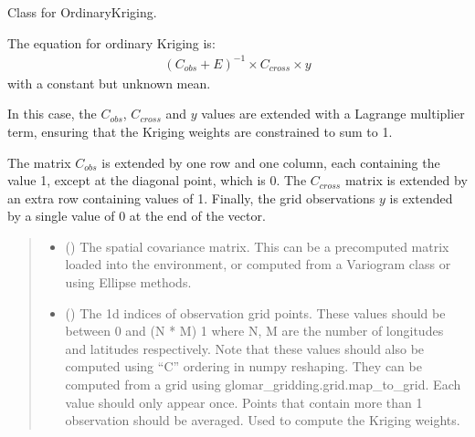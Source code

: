 \documentclass[letterpaper,10pt,english]{sphinxmanual}
\begin{document}
\begin{fulllineitems}
\label{\detokenize{kriging:glomar_gridding.kriging.OrdinaryKriging}}
\pysigstartsignatures
\pysiglinewithargsret
{}
{\sphinxparamcomma {}\sphinxparamcomma {}\sphinxparamcomma {}}
{}
\pysigstopsignatures
\sphinxAtStartPar
Class for OrdinaryKriging.

\sphinxAtStartPar
The equation for ordinary Kriging is:
\begin{equation*}
\begin{split}(C_{obs} + E)^{-1} \times C_{cross} \times y\end{split}
\end{equation*}
\sphinxAtStartPar
with a constant but unknown mean.

\sphinxAtStartPar
In this case, the \(C_{obs}\), \(C_{cross}\) and \(y\) values
are extended with a Lagrange multiplier term, ensuring that the Kriging
weights are constrained to sum to 1.

\sphinxAtStartPar
The matrix \(C_{obs}\) is extended by one row and one column, each
containing the value 1, except at the diagonal point, which is 0. The
\(C_{cross}\) matrix is extended by an extra row containing values of 1.
Finally, the grid observations \(y\) is extended by a single value of 0
at the end of the vector.
\begin{quote}\begin{description}
\begin{itemize}
\item {}
\sphinxAtStartPar
{} () \textendash{} The spatial covariance matrix. This can be a pre\sphinxhyphen{}computed matrix loaded
into the environment, or computed from a Variogram class or using
Ellipse methods.

\item {}
\sphinxAtStartPar
{} () \textendash{} The 1d indices of observation grid points. These values should be
between 0 and (N * M) \sphinxhyphen{} 1 where N, M are the number of longitudes
and latitudes respectively. Note that these values should also be
computed using “C” ordering in numpy reshaping. They can be
computed from a grid using glomar\_gridding.grid.map\_to\_grid. Each
value should only appear once. Points that contain more than 1
observation should be averaged. Used to compute the Kriging weights.


\end{itemize}
\end{description}
\end{quote}
\end{fulllineitems}
\end{document}
